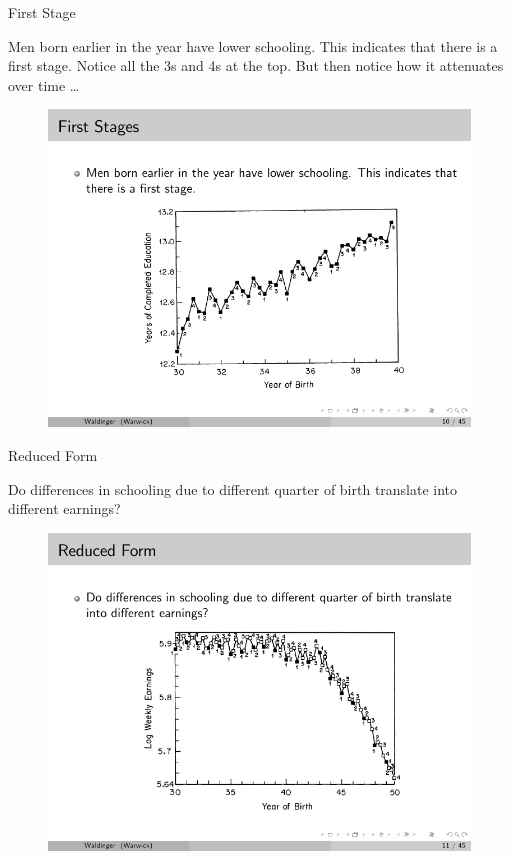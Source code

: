 \documentclass{beamer}
\begin{document}
\begin{frame}{First Stage}
	
	 Men born earlier in the year have lower schooling. This indicates that there is a first stage. Notice all the 3s and 4s at the top. But then notice how it attenuates over time \dots
	
	\begin{figure}
	\includegraphics{./lecture_includes/qob_2.pdf}
	\end{figure}
	
\end{frame}


\begin{frame}{Reduced Form}
	
	 Do differences in schooling due to different quarter of birth translate into different earnings?
	
	\begin{figure}
	\includegraphics{./lecture_includes/qob_3.pdf}
	\end{figure}
	
\end{frame}
\end{document}
